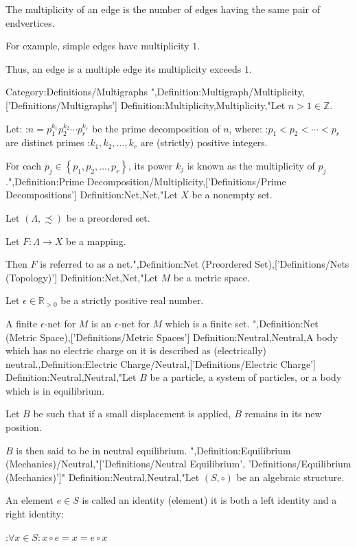 The multiplicity of an edge is the number of edges having the same pair of endvertices.


For example, simple edges have multiplicity $1$.

Thus, an edge is a multiple edge  its multiplicity exceeds $1$.

Category:Definitions/Multigraphs
",Definition:Multigraph/Multiplicity,['Definitions/Multigraphs']
Definition:Multiplicity,Multiplicity,"Let $n > 1 \in \mathbb Z$.

Let:
:$n = p_1^{k_1} p_2^{k_2} \cdots p_r^{k_r}$
be the prime decomposition of $n$, where:
:$p_1 < p_2 < \cdots < p_r$ are distinct primes
:$k_1, k_2, \ldots, k_r$ are (strictly) positive integers.


For each $p_j \in \left\lbrace p_1, p_2, \ldots, p_r \right\rbrace$, its power $k_j$ is known as the multiplicity of $p_j$.",Definition:Prime Decomposition/Multiplicity,['Definitions/Prime Decompositions']
Definition:Net,Net,"Let $X$ be a nonempty set.

Let $\left( \Lambda, \precsim \right)$ be a preordered set.

Let $F: \Lambda \to X$ be a mapping.


Then $F$ is referred to as a net.",Definition:Net (Preordered Set),['Definitions/Nets (Topology)']
Definition:Net,Net,"Let $M$ be a metric space.

Let $\epsilon \in \mathbb R_{>0}$ be a strictly positive real number.


A finite $\epsilon$-net for $M$ is an $\epsilon$-net for $M$ which is a finite set.
",Definition:Net (Metric Space),['Definitions/Metric Spaces']
Definition:Neutral,Neutral,A body which has no electric charge on it is described as (electrically) neutral.,Definition:Electric Charge/Neutral,['Definitions/Electric Charge']
Definition:Neutral,Neutral,"Let $B$ be a particle, a system of particles, or a body which is in equilibrium.

Let $B$ be such that if a small displacement is applied, $B$ remains in its new position.


$B$ is then said to be in neutral equilibrium.
",Definition:Equilibrium (Mechanics)/Neutral,"['Definitions/Neutral Equilibrium', 'Definitions/Equilibrium (Mechanics)']"
Definition:Neutral,Neutral,"Let $\left( S, \circ \right)$ be an algebraic structure.

An element $e \in S$ is called an identity (element)  it is both a left identity and a right identity:

:$\forall x \in S: x \circ e = x = e \circ x$


